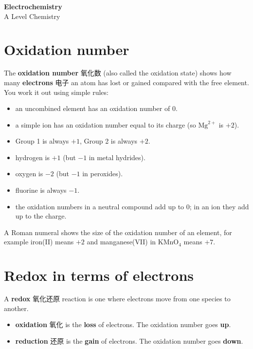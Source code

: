 \documentclass[11pt]{article}
\begin{document}
\begin{center}
  {\LARGE\bfseries Electrochemistry}\\[0.35em]
  {\large A Level Chemistry}
\end{center}
\vspace{0.6em}

\section*{Oxidation number}

The \textbf{oxidation number} 氧化数 (also called the oxidation state) shows how many \textbf{electrons} 电子 an atom has lost or gained compared with the free element. You work it out using simple rules:

\begin{itemize}
\item an uncombined element has an oxidation number of $0$.

\item a simple ion has an oxidation number equal to its charge (so $\text{Mg}^{2+}$ is $+2$).

\item Group 1 is always $+1$, Group 2 is always $+2$.

\item hydrogen is $+1$ (but $-1$ in metal hydrides).

\item oxygen is $-2$ (but $-1$ in peroxides).

\item fluorine is always $-1$.

\item the oxidation numbers in a neutral compound add up to $0$; in an ion they add up to the charge.

\end{itemize}

A Roman numeral shows the size of the oxidation number of an element, for example iron(II) means $+2$ and manganese(VII) in $\text{KMnO}_4$ means $+7$.

\section*{Redox in terms of electrons}

A \textbf{redox} 氧化还原 reaction is one where electrons move from one species to another.

\begin{itemize}
\item \textbf{oxidation} 氧化 is the \textbf{loss} of electrons. The oxidation number goes \textbf{up}.

\item \textbf{reduction} 还原 is the \textbf{gain} of electrons. The oxidation number goes \textbf{down}.

\end{itemize}
\end{document}
